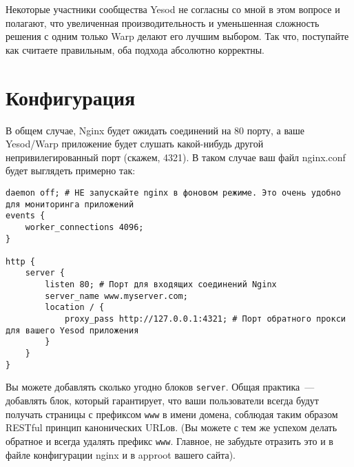 Некоторые участники сообщества Yesod не согласны со мной в этом вопросе и полагают, что увеличенная производительность и уменьшенная сложность решения с одним только Warp делают его лучшим выбором. Так что, поступайте как считаете правильным, оба подхода абсолютно корректны.

%
\section{Конфигурация}
%
%
В общем случае, Nginx будет ожидать соединений на 80 порту, а ваше Yesod/Warp приложение будет слушать какой-нибудь другой непривилегированный порт (скажем, 4321). В таком случае ваш файл nginx.conf будет выглядеть примерно так:

%
%
\begin{lstlisting}
daemon off; # НЕ запускайте nginx в фоновом режиме. Это очень удобно для мониторинга приложений
events {
    worker_connections 4096;
}

http {
    server {
        listen 80; # Порт для входящих соединений Nginx
        server_name www.myserver.com;
        location / {
            proxy_pass http://127.0.0.1:4321; # Порт обратного прокси для вашего Yesod приложения
        }
    }
}
\end{lstlisting}
%

Вы можете добавлять сколько угодно блоков \lstinline{server}. Общая практика~--- добавлять блок, который гарантирует, что ваши пользователи всегда будут получать страницы с префиксом \lstinline{www} в имени домена, соблюдая таким образом RESTful принцип канонических URLов. (Вы можете с тем же успехом делать обратное и всегда удалять префикс \lstinline{www}. Главное, не забудьте отразить это и в файле конфигурации nginx и в approot вашего сайта).

